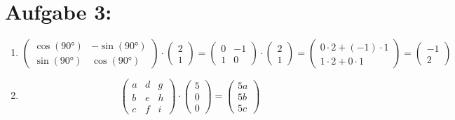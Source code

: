 \documentclass[11pt]{article}
\begin{document}
\section*{Aufgabe 3:}
\begin{enumerate}
  \item
        \[
          \begin{pmatrix}
            \cos(90\text{°}) & -\sin(90\text{°}) \\
            \sin(90\text{°}) & \cos(90\text{°})
          \end{pmatrix}
          \cdot
          \begin{pmatrix}
            2 \\
            1
          \end{pmatrix}
          =
          \begin{pmatrix}
            0 & -1 \\
            1 & 0
          \end{pmatrix}
          \cdot
          \begin{pmatrix}
            2 \\
            1
          \end{pmatrix}
          =
          \begin{pmatrix}
            0 \cdot 2 + (-1) \cdot 1 \\
            1 \cdot 2 + 0 \cdot 1
          \end{pmatrix}
          =
          \begin{pmatrix}
            -1 \\
            2
          \end{pmatrix}
        \]

  \item
        \[
          \begin{pmatrix}
            a & d & g \\
            b & e & h \\
            c & f & i
          \end{pmatrix}
          \cdot
          \begin{pmatrix}
            5 \\
            0 \\
            0
          \end{pmatrix}
          =
          \begin{pmatrix}
            5a \\
            5b \\
            5c
          \end{pmatrix}
        \]


\end{enumerate}
\end{document}

